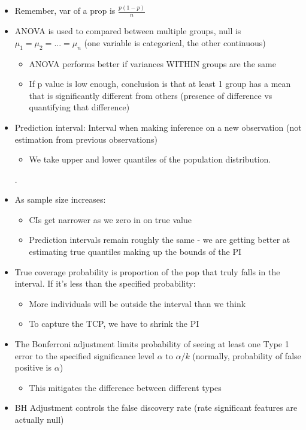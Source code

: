 \documentclass[8pt,landscape,a4paper, fleqn, dvipsnames]{extarticle}
\begin{document}
\begin{multicols*}{4}
\begin{itemize}
    \item Remember, var of a prop is $\frac{p(1-p)}{n}$
    \item ANOVA is used to compared between multiple groups, null is $\mu_1 = \mu_2 = ... = \mu_n$ (one variable is categorical, the other continuous)
    \begin{itemize}
        \item ANOVA performs better if variances WITHIN groups are the same
        \item If p value is low enough, conclusion is that at least 1 group has a mean that is significantly different from others (presence of difference vs quantifying that difference)
    \end{itemize}
    \item Prediction interval: Interval when making inference on a new observation (not estimation from previous observations)
    \begin{itemize}
        \item We take upper and lower quantiles of the population distribution.
    \end{itemize}. 
    \item As sample size increases:
    \begin{itemize}
        \item CIs get narrower as we zero in on true value
        \item Prediction intervals remain roughly the same - we are getting better at estimating true quantiles making up the bounds of the PI
    \end{itemize}
    \item True coverage probability is proportion of the pop that truly falls in the interval. If it's less than the specified probability:
    \begin{itemize}
        \item More individuals will be outside the interval than we think
        \item To capture the TCP, we have to shrink the PI
    \end{itemize}
    \item The Bonferroni adjustment limits probability of seeing at least one Type 1 error to the specified significance level $\alpha$ to $\alpha/k$ (normally, probability of false positive is $\alpha$)
    \begin{itemize}
        \item This mitigates the difference between different types
    \end{itemize}
    \item BH Adjustment controls the false discovery rate (rate significant features are actually null)
\end{itemize}
    
\end{multicols*}
\end{document}
